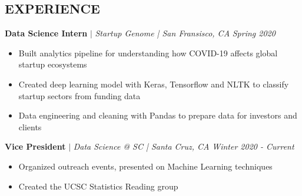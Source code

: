 \documentclass[margin]{res}
\begin{document}
\begin{resume}
\section{EXPERIENCE} 
   \textbf{Data Science Intern} $\mid$ \textit{Startup Genome | San Fransisco, CA} \hfill {\sl Spring 2020}
    \begin{itemize}
        \item Built analytics pipeline for understanding how COVID-19 affects global startup ecosystems
        \item Created deep learning model with Keras, Tensorflow and NLTK to classify startup sectors from funding data 
        \item Data engineering and cleaning with Pandas to prepare data for investors and clients
    \end{itemize} \vspace*{-10pt}

    \textbf{Vice President} $\mid$ \textit{Data Science @ SC | Santa Cruz, CA} \hfill {\sl Winter 2020 - Current}
    \begin{itemize}
        \item Organized outreach events, presented on Machine Learning techniques
        \item Created the UCSC Statistics Reading group
    \end{itemize} \vspace*{-10pt}

\end{resume}
\end{document}
